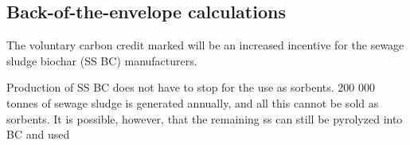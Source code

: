 \subsection{Back-of-the-envelope calculations} 
The voluntary carbon credit marked will be an increased incentive for the sewage sludge biochar (SS BC) manufacturers. 

Production of SS BC does not have to stop for the use as sorbents. 200 000 tonnes of sewage sludge is generated annually, and all this cannot be sold as sorbents. It is possible, however, that the remaining ss can still be pyrolyzed into BC and used 



 






